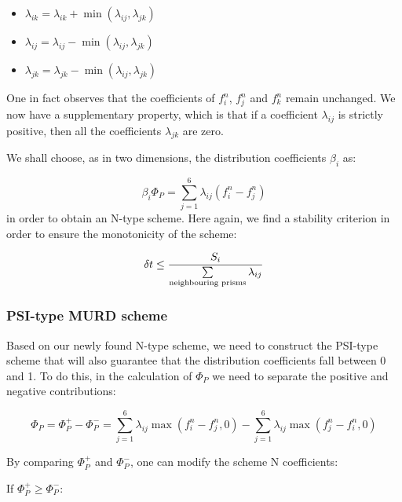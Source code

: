 \begin{itemize}
\item $\lambda_{ik}=\lambda_{ik}+\min(\lambda_{ij},\lambda_{jk})$

\item $\lambda_{ij}=\lambda_{ij}-\min(\lambda_{ij},\lambda_{jk})$

\item $\lambda_{jk}=\lambda_{jk}-\min(\lambda_{ij},\lambda_{jk})$
\end{itemize}

One in fact observes that the coefficients of $f_{i}^{n}$, $f_{j}^{n}$ and
$f_{k}^{n}$ remain unchanged. We now have a supplementary property, which is
that if a coefficient $\lambda_{ij}$ is strictly positive, then all the
coefficients $\lambda_{jk}$ are zero.

We shall choose, as in two dimensions, the distribution coefficients
$\beta_{i}$ as:%

\begin{equation}
\beta_{i}\Phi_{P}=\sum\limits_{j=1}^{6}\lambda_{ij}(f_{i}^{n}-f_{j}^{n})
\end{equation}
in order to obtain an N-type scheme. Here again, we find a stability criterion
in order to ensure the monotonicity of the scheme:%

\begin{equation}
\delta t\leq\dfrac{S_{i}}{\sum\limits_{\text{neighbouring\thinspace\thinspace
prisms}}\lambda_{ij}}%
\end{equation}


\subsubsection{PSI-type MURD scheme}

Based on our newly found N-type scheme, we need to construct the PSI-type
scheme that will also guarantee that the distribution coefficients fall
between 0 and 1. To do this, in the calculation of $\Phi_{P}$ we need to
separate the positive and negative contributions:%

\begin{equation}
\Phi_{P}=\Phi_{P}^{+}-\Phi_{P}^{-}=\sum\limits_{j=1}^{6}\lambda_{ij}\max
(f_{i}^{n}-f_{j}^{n},0)-\sum\limits_{j=1}^{6}\lambda_{ij}\max(f_{j}^{n}%
-f_{i}^{n},0)
\end{equation}


By comparing $\Phi_{P}^{+}$ and $\Phi_{P}^{-}$, one can modify the scheme N coefficients:

If $\Phi_{P}^{+}\geq\Phi_{P}^{-}$:

